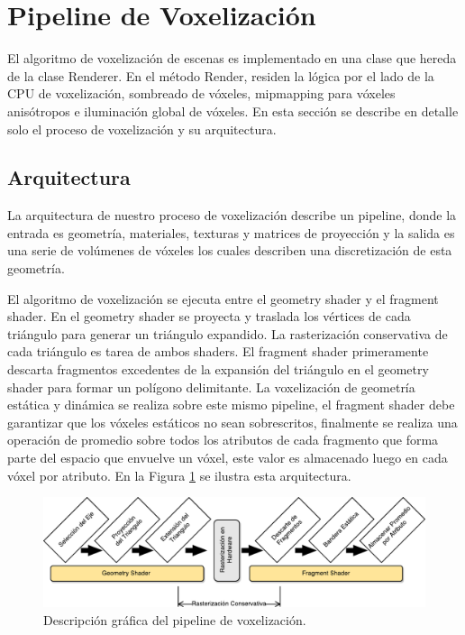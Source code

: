 \section{Pipeline de Voxelización} %
\label{sec:pipeline_de_voxelizacion}
El algoritmo de voxelización de escenas es implementado en una clase que hereda de la clase Renderer. En el método Render, residen la lógica por el lado de la CPU de voxelización, sombreado de vóxeles, mipmapping para vóxeles anisótropos e iluminación global de vóxeles. En esta sección se describe en detalle solo el proceso de voxelización y su arquitectura.
\subsection{Arquitectura}

La arquitectura de nuestro proceso de voxelización describe un pipeline, donde la entrada es geometría, materiales, texturas y matrices de proyección y la salida es una serie de volúmenes de vóxeles los cuales describen una discretización de esta geometría.

El algoritmo de voxelización se ejecuta entre el geometry shader y el fragment shader. En el geometry shader se proyecta y traslada los vértices de cada triángulo para generar un triángulo expandido. La rasterización conservativa de cada triángulo es tarea de ambos shaders. El fragment shader primeramente descarta fragmentos excedentes de la expansión del triángulo en el geometry shader para formar un polígono delimitante. La voxelización de geometría estática y dinámica se realiza sobre este mismo pipeline, el fragment shader debe garantizar que los vóxeles estáticos no sean sobrescritos, finalmente se realiza una operación de promedio sobre todos los atributos de cada fragmento que forma parte del espacio que envuelve un vóxel, este valor es almacenado luego en cada vóxel por atributo. En la Figura \ref{fig:voxel_pipeline_impl} se ilustra esta arquitectura.
\begin{figure}[H]
    \centering
    \includegraphics[width=\linewidth]{media/voxel_pipeline_cropped.pdf}
    \caption{Descripción gráfica del pipeline de voxelización.}
    \label{fig:voxel_pipeline_impl}
\end{figure}

